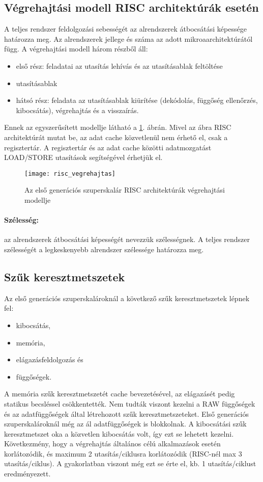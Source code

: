 \subsection{Végrehajtási modell RISC architektúrák esetén}
A teljes rendszer feldolgozási sebességét az alrendszerek átbocsátási képessége határozza meg.
Az alrendszerek jellege és száma az adott mikroaarchitektúrától függ.
A végrehajtási modell három részből áll:
\begin{itemize}
    \item első rész: feladatai az utasítás lehívás és az utasításablak feltöltése
    \item utasításablak
    \item hátsó rész: feladata az utasításablak kiürítése (dekódolás, függőség ellenőrzés, kibocsátás), végrehajtás és a visszaírás.
\end{itemize}
Ennek az egyszerűsített modellje látható a \ref{fig:risc_vegrehajtas}. ábrán.
Mivel az ábra RISC architektúrát mutat be, az adat cache közvetlenül nem érhető el, csak a regisztertár.
A regisztertár és az adat cache közötti adatmozgatást LOAD/STORE utasítások segítségével érhetjük el.
\begin{figure}[h]
    \texttt{[image: risc\_vegrehajtas]}
    \centering
    \caption{Az első generációs szuperskalár RISC architektúrák végrehajtási modellje}
    \label{fig:risc_vegrehajtas}
\end{figure}
\paragraph{Szélesség:} az alrendszerek átbocsátási képességét nevezzük szélességnek.
A teljes rendszer szélességét a legkeskenyebb alrendszer szélessége határozza meg.

\subsection{Szűk keresztmetszetek}
Az első generációs szuperskalároknál a következő szűk keresztmetszetek lépnek fel:
\begin{itemize}
    \item kibocsátás,
    \item memória,
    \item elágazásfeldolgozás és
    \item függőségek.
\end{itemize}
A memória szűk keresztmetszetét cache bevezetésével, az elágazásét pedig statikus becsléssel csökkentették.
Nem tudták viszont kezelni a RAW függőségek és az adatfüggőségek által létrehozott szűk keresztmetszeteket.
Első generációs szuperskalároknál még az ál adatfüggőségek is blokkolnak.
A kibocsátási szűk keresztmetszet oka a közvetlen kibocsátás volt, így ezt se lehetett kezelni.
Következmény, hogy a végrehajtás általános célú alkalmazások esetén korlátozódik, és maximum 2 utasítás/ciklusra korlátozódik (RISC-nél max 3 utasítás/ciklus).
A gyakorlatban viszont még ezt se érte el, kb. 1 utasítás/ciklust eredményezett.


